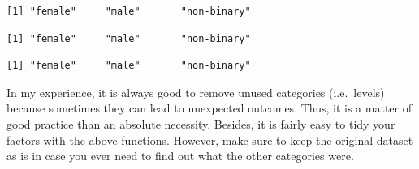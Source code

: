 \documentclass[
  letterpaper,
]{krantz}
\makeatletter
\newenvironment{Shaded}{\begin{snugshade}}{\end{snugshade}}
\newcommand{\AttributeTok}[1]{\textcolor[rgb]{0.40,0.45,0.13}{#1}}
\newcommand{\CommentTok}[1]{\textcolor[rgb]{0.37,0.37,0.37}{#1}}
\newcommand{\FunctionTok}[1]{\textcolor[rgb]{0.28,0.35,0.67}{#1}}
\newcommand{\NormalTok}[1]{\textcolor[rgb]{0.00,0.23,0.31}{#1}}
\newcommand{\OtherTok}[1]{\textcolor[rgb]{0.00,0.23,0.31}{#1}}
\newcommand{\SpecialCharTok}[1]{\textcolor[rgb]{0.37,0.37,0.37}{#1}}
\newenvironment{kframe}{%
\medskip{}
\setlength{\fboxsep}{.8em}
 \def\at@end@of@kframe{}%
 \ifinner\ifhmode%
  \def\at@end@of@kframe{\end{minipage}}%
  \begin{minipage}{\columnwidth}%
 \fi\fi%
 \def\FrameCommand##1{\hskip\@totalleftmargin \hskip-\fboxsep
 \colorbox{shadecolor}{##1}\hskip-\fboxsep
     \hskip-\linewidth \hskip-\@totalleftmargin \hskip\columnwidth}%
 \MakeFramed {\advance\hsize-\width
   \@totalleftmargin\z@ \linewidth\hsize
   \@setminipage}}%
 {\par\unskip\endMakeFramed%
 \at@end@of@kframe}
\renewenvironment{Shaded}{\begin{kframe}}{\end{kframe}}
\makeatother
\begin{document}
\begin{Shaded}
\end{Shaded}

\begin{verbatim}
[1] "female"     "male"       "non-binary"
\end{verbatim}

\begin{Shaded}
\end{Shaded}

\begin{verbatim}
[1] "female"     "male"       "non-binary"
\end{verbatim}

\begin{Shaded}
\end{Shaded}

\begin{verbatim}
[1] "female"     "male"       "non-binary"
\end{verbatim}

In my experience, it is always good to remove unused categories
(i.e.~levels) because sometimes they can lead to unexpected outcomes.
Thus, it is a matter of good practice than an absolute necessity.
Besides, it is fairly easy to tidy your factors with the above
functions. However, make sure to keep the original dataset as is in case
you ever need to find out what the other categories were.
\end{document}
